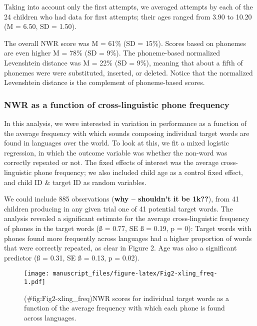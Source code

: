 \documentclass[english,,man,floatsintext]{apa6}
\begin{document}
Taking into account only the first attempts, we averaged attempts by each of the 24 children who had data for first attempts; their ages ranged from 3.90 to 10.20 (M = 6.50, SD = 1.50).

The overall NWR score was M = 61\% (SD = 15\%). Scores based on phonemes are even higher M = 78\% (SD = 9\%). The phoneme-based normalized Levenshtein distance was M = 22\% (SD = 9\%), meaning that about a fifth of phonemes were were substituted, inserted, or deleted. Notice that the normalized Levenshtein distance is the complement of phoneme-based scores.

\hypertarget{nwr-as-a-function-of-cross-linguistic-phone-frequency}{%
\subsubsection{NWR as a function of cross-linguistic phone frequency}\label{nwr-as-a-function-of-cross-linguistic-phone-frequency}}

In this analysis, we were interested in variation in performance as a function of the average frequency with which sounds composing individual target words are found in languages over the world. To look at this, we fit a mixed logistic regression, in which the outcome variable was whether the non-word was correctly repeated or not. The fixed effects of interest was the average cross-linguistic phone frequency; we also included child age as a control fixed effect, and child ID \& target ID as random variables.

We could include 885 observations (\textbf{why -- shouldn't it be 1k??}), from 41 children producing in any given trial one of 41 potential target words. The analysis revealed a significant estimate for the average cross-linguistic frequency of phones in the target words (ß = 0.77, SE ß = 0.19, p = 0): Target words with phones found more frequently across languages had a higher proportion of words that were correctly repeated, as clear in Figure 2. Age was also a significant predictor (ß = 0.31, SE ß = 0.13, p = 0.02).

\begin{figure}
\centering
\texttt{[image: manuscript\_files/figure-latex/Fig2-xling\_freq-1.pdf]}
\caption{(\#fig:Fig2-xling\_freq)NWR scores for individual target words as a function of the average frequency with which each phone is found across languages.}
\end{figure}
\end{document}
